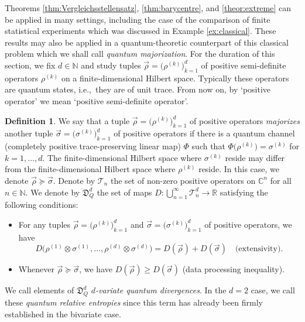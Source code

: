 \documentclass[12pt,a4paper,reqno]{amsart}
\theoremstyle{definition}
\newtheorem{definition}[proposition]{Definition}
\newcommand{\mc}[1]{\mathcal{#1}}
\newcommand{\mf}[1]{\mathfrak{#1}}
\newcommand{\N}{\mathbb N}
\newcommand{\R}{\mathbb R}
\newcommand{\C}{\mathbb C}
\begin{document}
Theorems \ref{thm:Vergleichsstellensatz}, \ref{thm:barycentre}, and \ref{theor:extreme} can be applied in many settings, including the case of the comparison of finite statistical experiments which was discussed in Example \ref{ex:classical}. These results may also be applied in a quantum-theoretic counterpart of this classical problem which we shall call {\it quantum majorization}. For the duration of this section, we fix $d\in\N$ and study tuples $\vec{\rho}=\big(\rho^{(k)}\big)_{k=1}^d$ of positive semi-definite operators $\rho^{(k)}$ on a finite-dimensional Hilbert space. Typically these operators are quantum states, i.e.,\ they are of unit trace. From now on, by `positive operator' we mean `positive semi-definite operator'.

\begin{definition}\label{def:DQ}
We say that a tuple $\vec{\rho}=\big(\rho^{(k)}\big)_{k=1}^d$ of positive operators {\it majorizes} another tuple $\vec{\sigma}=\big(\sigma^{(k)}\big)_{k=1}^d$ of positive operators if there is a quantum channel (completely positive trace-preserving linear map) $\Phi$ such that $\Phi\big(\rho^{(k)}\big)=\sigma^{(k)}$ for $k=1,\ldots,d$. The finite-dimensional Hilbert space where $\sigma^{(k)}$ reside may differ from the finite-dimensional Hilbert space where $\rho^{(k)}$ reside. In this case, we denote $\vec{\rho}\succeq\vec{\sigma}$. Denote by $\mc T_n$ the set of non-zero positive operators on $\C^n$ for all $n\in\N$. We denote by $\mf D_Q^d$ the set of maps $D:\bigcup_{n=1}^\infty\mc T_n^d\to\R$ satisfying the following conditions:
\begin{itemize}
\item[(a)] For any tuples $\vec{\rho}=\big(\rho^{(k)}\big)_{k=1}^d$ and $\vec{\sigma}=\big(\sigma^{(k)}\big)_{k=1}^d$ of positive operators, we have
$$
D\big(\rho^{(1)}\otimes\sigma^{(1)},\ldots,\rho^{(d)}\otimes\sigma^{(d)}\big)=D(\vec{\rho})+D(\vec{\sigma})\quad\textrm{(extensivity).}
$$
\item[(b)] Whenever $\vec{\rho}\succeq\vec{\sigma}$, we have $D(\vec{\rho})\geq D(\vec{\sigma})$ (data processing inequality).
\end{itemize}
We call elements of $\mf D_Q^d$ {\it $d$-variate quantum divergences}. In the $d=2$ case, we call these {\it quantum relative entropies} since this term has already been firmly established in the bivariate case.
\end{definition}
\end{document}
